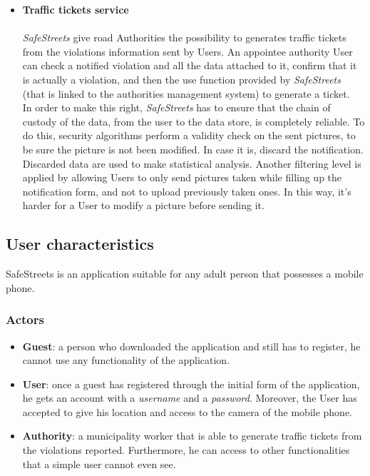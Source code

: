 \begin{itemize}
    
    \item\textbf{Traffic tickets service}\\\\
    \textit{SafeStreets} give road Authorities the possibility to generates traffic tickets from the violations information sent by Users. An appointee authority User can check a notified violation and all the data attached to it, confirm that it is actually a violation, and then the use function provided by \textit{SafeStreets} (that is linked to the authorities management system) to generate a ticket. \\
    In order to make this right, \textit{SafeStreets} has to ensure that the chain of custody of the data, from the user to the data store, is completely reliable. To do this, security algorithms perform a validity check on the sent pictures, to be sure the picture is not been modified. In case it is, discard the notification. Discarded data are used to make statistical analysis.
    Another filtering level is applied by allowing Users to only send pictures taken while filling up the notification form, and not to upload previously taken ones. In this way, it's harder for a User to modify a picture before sending it. 
\end{itemize}

\subsection{User
characteristics}
SafeStreets is an application suitable for any adult person that possesses a mobile phone.
\subsubsection{Actors}
\begin{itemize}
    \item \textbf{Guest}: a person who downloaded the application and still has to register, he cannot use any functionality of the application.
    \item \textbf{User}: once a guest has registered through the initial form of the application, he gets an account with a \textit{username} and a \textit{password}. Moreover, the User has accepted to give his location and access to the camera of the mobile phone.
    \item \textbf{Authority}: a municipality worker that is able to generate traffic tickets from the violations reported. Furthermore, he can access to other functionalities that a simple user cannot even see.
\end{itemize}
